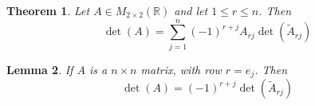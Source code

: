 \documentclass{article}
\newtheorem{theorem}{Theorem}[section]
\newtheorem{lemma}[theorem]{Lemma}
\newtheorem{one minute paper}[theorem]{One Minute Paper}
\begin{document}
\begin{theorem}
    Let $A \in M_{2 \times 2}(\mathbb{R})$ and let $1 \leq r \leq n$. Then 
    \begin{equation}
        \det(A) = \sum_{j=1}^{n}(-1)^{r+j}A_{rj}\det(\tilde{A}_{rj})
    \end{equation}
\end{theorem}

\begin{lemma}
    If $A$ is a $n \times n$ matrix, with row $r = e_{j}$. Then 
    \begin{equation}
        \det(A) = (-1)^{r+j}\det(\tilde{A}_{rj})
    \end{equation}
\end{lemma}
\end{document}
